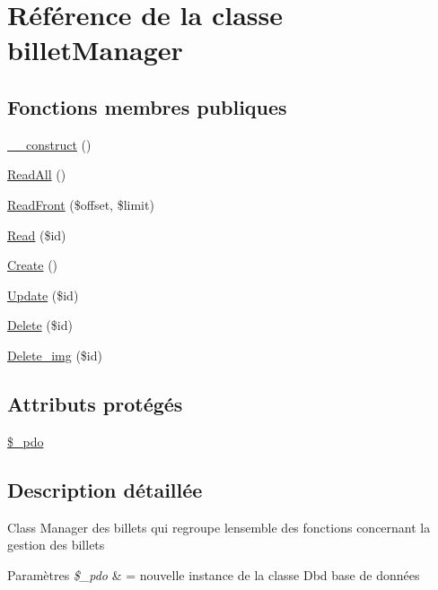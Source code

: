 \hypertarget{class_src_1_1_managers_1_1billet_manager}{}\section{Référence de la classe billet\+Manager}
\label{class_src_1_1_managers_1_1billet_manager}
\subsection*{Fonctions membres publiques}
\begin{DoxyCompactItemize}
\item 
\hyperlink{class_src_1_1_managers_1_1billet_manager_a095c5d389db211932136b53f25f39685}{\+\_\+\+\_\+construct} ()
\item 
\hyperlink{class_src_1_1_managers_1_1billet_manager_a24f9f6fa83eb8694eab0a87b2e6ad0b1}{Read\+All} ()
\item 
\hyperlink{class_src_1_1_managers_1_1billet_manager_af7e26a4a8ffd767a1265151f87860ddb}{Read\+Front} (\$offset, \$limit)
\item 
\hyperlink{class_src_1_1_managers_1_1billet_manager_ad2bbc9b3130abdfe3a9fc9e9fe36716f}{Read} (\$id)
\item 
\hyperlink{class_src_1_1_managers_1_1billet_manager_ad01f71fa0ecc039494e3c282864298c3}{Create} ()
\item 
\hyperlink{class_src_1_1_managers_1_1billet_manager_a82232b33fbfacdbdb8a8f49acaecf564}{Update} (\$id)
\item 
\hyperlink{class_src_1_1_managers_1_1billet_manager_a59113b5ecd1d155db6a4f30af34a1e80}{Delete} (\$id)
\item 
\hyperlink{class_src_1_1_managers_1_1billet_manager_a7da0978ffd29442d84e0d4374cb07e8a}{Delete\+\_\+img} (\$id)
\end{DoxyCompactItemize}
\subsection*{Attributs protégés}
\begin{DoxyCompactItemize}
\item 
\hyperlink{class_src_1_1_managers_1_1billet_manager_a1e6d977917b70dce7e26cebad8438bf4}{\$\+\_\+pdo}
\end{DoxyCompactItemize}


\subsection{Description détaillée}
Class Manager des billets qui regroupe l\textquotesingle{}ensemble des fonctions concernant la gestion des billets 
\begin{DoxyParams}{Paramètres}
{\em \$\+\_\+pdo} & = nouvelle instance de la classe Dbd base de données \\
\hline
\end{DoxyParams}


